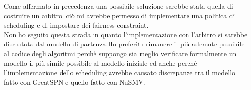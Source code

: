 \documentclass[a4paper]{article}
\begin{document}
Come affermato in precedenza una possibile soluzione sarebbe stata quella di costruire un arbitro, ciò mi avrebbe permesso di implementare una politica di scheduling e di impostare dei fairness constraint.\\
Non ho seguito questa strada in quanto l'implementazione con l'arbitro si sarebbe discostata dal modello di partenza.Ho preferito rimanere il più aderente possibile al codice degli algoritmi perchè suppongo sia meglio verificare formalmente un modello il più simile possibile al modello iniziale ed anche perchè l'implementazione dello scheduling avrebbe causato discrepanze tra il modello fatto con GreatSPN e quello fatto con NuSMV.
\end{document}
